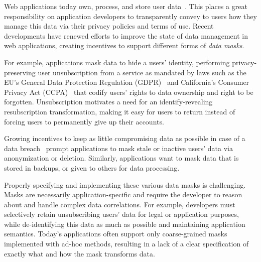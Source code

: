 \iffalse
Web applications today own, process, and store user data~\cite{nytimes:fb, npr:data}. This places a
great responsibility on application developers to transparently convey to users how they manage this
data via their privacy policies and terms of use.
%
Recent developments have renewed efforts to improve the state of data management in web
applications, creating incentives to support different forms of \emph{data masks}.

For example, applications mask data to hide a users' identity, performing privacy-preserving user
unsubscription from a service as mandated by laws such as the EU's General Data Protection
Regulation (GDPR)~\cite{eu:gdpr} and California's Consumer Privacy Act (CCPA)~\cite{ca:privacy-act}
that codify users' rights to data ownership and right to be forgotten. Unsubscription motivates a
need for an identify-revealing resubscription transformation, making it easy for users to return
instead of forcing users to permanently give up their accounts.

Growing incentives to keep as little compromising data as possible in case of a data
breach~\cite{breach:amazon,breach:twitter, breach:fb, breach:marriott, breach:quora} prompt
applications to mask stale or inactive users' data via anonymization or deletion. Similarly,
applications want to mask data that is stored in backups, or given to others for data processing.


Properly specifying and implementing these various data masks is challenging. Masks are necessarily
application-specific and require the developer to reason about and handle complex data correlations.
For example, developers must selectively retain unsubscribing users' data for legal or application
purposes, while de-identifying this data as much as possible and maintaining application semantics.
Today's applications often support only coarse-grained masks implemented with ad-hoc methods,
resulting in a lack of a clear specification of exactly what and how the mask transforms data.

